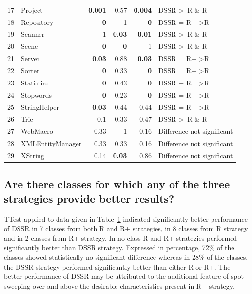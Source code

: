 \begin{table}[htp]
{\begin{tabular}{rlrrrl}
17		&	Project			&	\textbf{0.001}	&0.57			&\textbf{0.004}	& DSSR \textgreater~R \& R+ 				\\		
18		&	Repository		&	\textbf{0}		&1				&\textbf{0}		& DSSR = R+ \textgreater R 		\\
19		&	Scanner			&	1				&\textbf{0.03}	&\textbf{0.01}	& DSSR \textgreater~R \& R+  				\\
20		&	Scene			&	\textbf{0}		&\textbf{0}		& 1				& DSSR \textgreater~R \& R+  				\\
21		&	Server			&	\textbf{0.03}		& 0.88			&\textbf{0.03} 	& DSSR = R+ \textgreater R 		\\
22		&	Sorter			& 	\textbf{0}		& 0.33			&\textbf{0}		& DSSR = R+ \textgreater R 		\\
23		&	Statistics		&	\textbf{0}		& 0.43			&\textbf{0}		& DSSR = R+ \textgreater R 		\\
24		&	Stopwords		&	\textbf{0}		& 0.23			&\textbf{0}		& DSSR = R+ \textgreater R 		\\
25		&	StringHelper		&	\textbf{0.03}		& 0.44			&0.44			& DSSR = R+ \textgreater R 		\\
26		& 	Trie				&	0.1				& 0.33			&0.47			& DSSR \textgreater~R \& R+  				\\
27		&	WebMacro		&	0.33			& 1				&0.16			& Difference not significant		\\
28		&	XMLEntityManager&	0.33			& 0.33			&0.16			& Difference not significant		\\
29 		&	XString			&	0.14			&\textbf{0.03}	&0.86			& Difference not significant		\\


\end{tabular}
}
\bigskip
\label{table:ttest}
\end{table}

\subsection{Are there classes for which any of the three strategies provide better results?}

TTest applied to data given in Table~\ref{table:ttest} indicated significantly better performance of DSSR in 7 classes from both R and R+ strategies, in 8 classes from R strategy and in 2 classes from R+ strategy. In no class R and R+ strategies performed significantly better than DSSR strategy. Expressed in percentage, 72\%  of the classes showed statistically no significant difference whereas in 28\% of the classes, the DSSR strategy performed significantly better than either R or R+. The better performance of DSSR may be attributed to the additional feature of spot sweeping over and above the desirable characteristics present in R+ strategy. 


